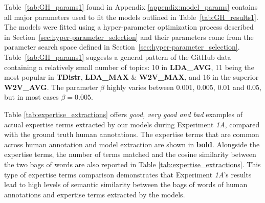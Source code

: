             Table~\ref{tab:GH_params1} found in Appendix \ref{appendix:model_params} contains all major parameters used to fit the models outlined in Table~\ref{tab:GH_results1}. The models were fitted using a hyper-parameter optimization process described in Section~\ref{sec:hyper-parameter_selection} and their parameters come from the parameter search space defined in Section~\ref{sec:hyper-parameter_selection}. Table~\ref{tab:GH_params1} suggests a general pattern of the GitHub data containing a relatively small number of topics: 10 in \textbf{LDA\_AVG}, 11 being the most popular in \textbf{TDistr}, \textbf{LDA\_MAX} \& \textbf{W2V\_MAX}, and 16 in the superior \textbf{W2V\_AVG}. The parameter $\beta$ highly varies between 0.001, 0.005, 0.01 and 0.05, but in most cases $\beta=0.005$.
            
            Table \ref{tab:expertise_extractions} offers \emph{good, very good and bad} examples of actual expertise terms extracted by our models during Experiment \emph{1A}, compared with the ground truth human annotations. The expertise terms that are common across human annotation and model extraction are shown in \textbf{bold}. Alongside the expertise terms, the number of terms matched and the cosine similarity between the two bags of words are also reported in Table \ref{tab:expertise_extractions}. This type of expertise terms comparison demonstrates that Experiment \emph{1A}'s results lead to high levels of semantic similarity between the bags of words of human annotations and expertise terms extracted by the models.
        
